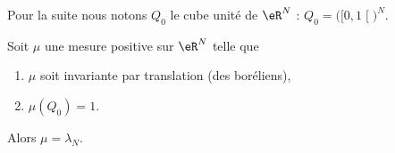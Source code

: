 	Pour la suite nous notons \( Q_0\) le cube unité de \( \eR^N\) : \( Q_0=\big( \mathopen[ 0 , 1 \mathclose[ \big)^N\).

																																			\begin{theorem}        \label{ThoCABFooHbUzWc}
																																			Soit \( \mu\) une mesure positive sur \( \eR^N\) telle que
																																			\begin{enumerate}
																																			\item
																																			\( \mu\) soit invariante par translation (des boréliens),
																																			\item
																																			\( \mu(Q_0)=1\).
																																			\end{enumerate}
																																			Alors \( \mu=\lambda_N\).
																																			\end{theorem}

